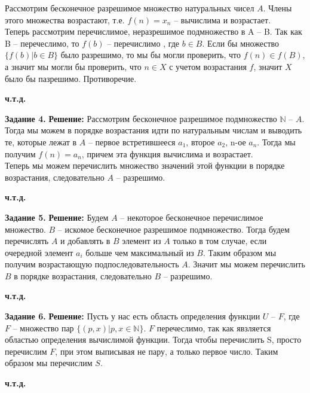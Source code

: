 \documentclass[12pt,a4paper]{scrartcl}
\begin{document}
	\indent
	Рассмотрим бесконечное разрешимое множество натуральных чисел $A$. Члены этого множества возрастают, т.е. $f(n) = x_n$ -- вычислима и возрастает. \\
	Теперь рассмотрим перечислимое, неразрешимое подмножество в A -- B. Так как B -- перечеслимо, то $f(b)$ -- перечислимо , где $b \in B$. Если бы множество $\{ f(b) | b \in B \}$ было разрешимо, то мы бы могли проверить, что $f(n) \in f(B)$, а значит мы могли бы проверить, что $n \in X$ с учетом возрастания $f$, значит $X$ было бы пазрешимо. Противоречие.
	\begin{flushright}
		\textbf{ч.т.д.}
	\end{flushright}
	\noindent
	\textbf{Задание 4.}
	\newline
	\textbf{Решение:}
	\newline
	\indent
	Рассмотрим бесконечное разрешимое подмножество $\mathbb{N}$ -- $A$. Тогда мы можем в порядке возрастания идти по натуральным числам и выводить те, которые лежат в $A$ -- первое встретившееся $a_1$, второе $a_2$, n-ое $a_n$. Тогда мы получим $f(n) = a_n$, причем эта функция вычислима и возрастает. \\
	Теперь мы можем перечислить множество значений этой функции в порядке возрастания, следовательно $A$ -- разрешимо.
	\begin{flushright}
		\textbf{ч.т.д.}
	\end{flushright}
	
	\noindent
	\textbf{Задание 5.}
	\newline
	\textbf{Решение:}
	\newline
	\indent
	Будем $A$ -- некоторое бесконечное перечислимое множество. $B$ -- искомое бесконечное разрешимое подмножество. Тогда будем перечислять $A$ и добавлять в $B$ элемент из $A$ только в том случае, если очередной элемент $a_i$ больше чем максимальный из $B$. Таким образом мы получим возрастающую подпоследовательность $A$. Значит мы можем перечислить $B$ в порядке возрастания, следовательно $B$ -- разрешимо.
	\begin{flushright}
		\textbf{ч.т.д.}
	\end{flushright}
	\textbf{Задание 6.}
	\newline
	\textbf{Решение:}
	\newline
	\indent
	Пусть у нас есть область определения функции $U$ -- $F$, где $F$ -- множество пар $\{(p, x) | p, x \in \mathbb{N}\}$. $F$ перечеслимо, так как явзляется областью определения вычислимой функции. Тогда чтобы перечислить S, просто перечислим $F$, при этом выписывая не пару, а только первое число. Таким образом мы перечислим $S$.
	\begin{flushright}
		\textbf{ч.т.д.}
	\end{flushright}
\end{document}
